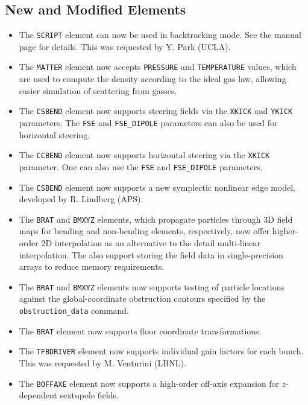 \documentclass[11pt]{article}
\begin{document}
\subsection{New and Modified Elements}
\begin{itemize}
\item The \verb|SCRIPT| element can now be used in backtracking mode. See the manual page for details. This was requested
  by Y. Park (UCLA).
\item The \verb|MATTER| element now accepts \verb|PRESSURE| and \verb|TEMPERATURE| values, which are used to
  compute the density according to the ideal gas law, allowing easier simulation of scattering from gasses.
\item The \verb|CSBEND| element now supports steering fields via the \verb|XKICK| and \verb|YKICK| parameters.
  The \verb|FSE| and \verb|FSE_DIPOLE| parameters can also be used for horizontal steering.
\item The \verb|CCBEND| element now supports horizontal steering via the \verb|XKICK| parameter. One can also
  use the \verb|FSE| and \verb|FSE_DIPOLE| parameters.
\item The \verb|CSBEND| element now supports a new symplectic nonlinear edge model, developed by R. Lindberg (APS).
\item The \verb|BRAT| and \verb|BMXYZ| elements, which propagate particles through 3D field maps for
  bending and non-bending elements, respectively, now offer higher-order 2D interpolation as an alternative to the
  detail multi-linear interpolation. The also support storing the field data in single-precision arrays to reduce memory
  requirements.
\item The \verb|BRAT| and \verb|BMXYZ| elements now supports testing of particle locations against the global-coordinate obstruction
  contours specified by the \verb|obstruction_data| command.
\item The \verb|BRAT| element now supports floor coordinate transformations.
\item The \verb|TFBDRIVER| element now supports individual gain factors for each bunch. This was requested by
  M. Venturini (LBNL).
\item The \verb|BOFFAXE| element now supports a high-order off-axis expansion for $z$-dependent sextupole fields.
\end{itemize}
\end{document}
